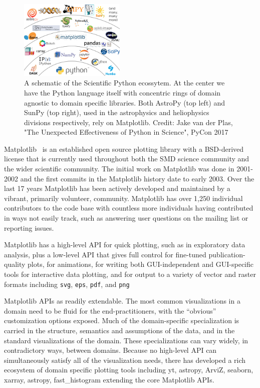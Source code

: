 \documentclass[12pt]{article}
\numberwithin{page}{section}
\begin{document}
\begin{figure}
  \includegraphics[width=0.45\textwidth]{scipy-ecosystem}
  \caption{A schematic of the Scientific Python ecossytem.  At the
    center we have the Python language itself with concentric rings of
    domain agnostic to domain specific libraries.  Both AstroPy (top
    left) and SunPy (top right), used in the astrophysics and
    heliophysics divisions respectively, rely on Matplotlib.
    Credit: Jake van der Plas, "The Unexpected Effectiveness of Python
    in Science", PyCon 2017}
  \label{fig:ecosystem}
\end{figure}



Matplotlib~\cite{Hunter:2007} is an established open source plotting
library with a BSD-derived license that is currently used throughout
both the SMD science community and the wider scientific community.
The initial work on Matplotlib was done in 2001-2002 and the first
commits in the Matplotlib history date to early 2003.  Over the last
17 years Matplotlib has been actively developed and maintained by a
vibrant, primarily volunteer, community.  Matplotlib has over 1,250
individual contributors to the code base with countless more
individuals having contributed in ways not easily track, such as
answering user questions on the mailing list or reporting issues.

Matplotlib has a high-level API for quick plotting, such as in
exploratory data analysis, plus a low-level API that gives full control for
fine-tuned publication-quality plots, for animations, for writing both
GUI-independent and GUI-specific tools for interactive data plotting, and
for output to a variety of vector and raster
formats including \texttt{svg}, \texttt{eps},
\texttt{pdf}, and \texttt{png}

Matplotlib APIs as readily extendable.  The most common visualizations
in a domain need to be fluid for the end-practitioners, with the
``obvious'' customization options exposed. Much of the domain-specific
specialization is carried in the structure, semantics and assumptions
of the data, and in the standard visualizations of the domain. These
specializations can vary widely, in contradictory ways, between
domains. Because no high-level API can simultaneously satisfy all of
the visualization needs, there has developed a rich ecosystem of
domain specific plotting tools including yt, astropy, ArviZ,
seaborn, xarray, astropy, fast\_histogram extending the core
Matplotlib APIs.
\end{document}
